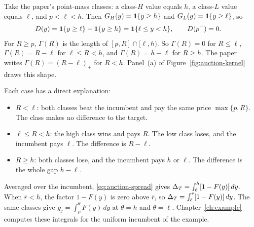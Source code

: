 Take the paper's point-mass classes: a class-\(H\) value equals \(h\), a class-\(L\) value equals \(\ell\), and
\(p<\ell<h\). Then \(G_H(y)=\mathbf{1}\{y\ge h\}\) and \(G_L(y)=\mathbf{1}\{y\ge\ell\}\), so
\[
D(y)=\mathbf{1}\{y\ge\ell\}-\mathbf{1}\{y\ge h\}=\mathbf{1}\{\ell\le y<h\},\qquad D(p^-)=0.
\]
For \(R\ge p\), \(\Gamma(R)\) is the length of \([p,R]\cap[\ell,h)\). So \(\Gamma(R)=0\) for \(R\le\ell\),
\(\Gamma(R)=R-\ell\) for \(\ell\le R<h\), and \(\Gamma(R)=h-\ell\) for \(R\ge h\). The paper writes
\(\Gamma(R)=(R-\ell)_+\) for \(R<h\). Panel~(a) of Figure~\ref{fig:auction-kernel} draws this shape.

Each case has a direct explanation:
\begin{itemize}
\item \(R<\ell\): both classes beat the incumbent and pay the same price \(\max\{p,R\}\). The class makes no
difference to the target.
\item \(\ell\le R<h\): the high class wins and pays \(R\). The low class loses, and the incumbent pays \(\ell\).
The difference is \(R-\ell\).
\item \(R\ge h\): both classes lose, and the incumbent pays \(h\) or \(\ell\). The difference is the whole gap
\(h-\ell\).
\end{itemize}
Averaged over the incumbent, \eqref{eq:auction-spread} gives \(\Delta_T=\int_\ell^h[1-F(y)]\,dy\). When \(\bar r<h\),
the factor \(1-F(y)\) is zero above \(\bar r\), so \(\Delta_T=\int_\ell^{\bar r}[1-F(y)]\,dy\). The same classes give
\(g_j=\int_p^\theta F(y)\,dy\) at \(\theta=h\) and \(\theta=\ell\). Chapter~\ref{ch:example} computes these
integrals for the uniform incumbent of the example.

